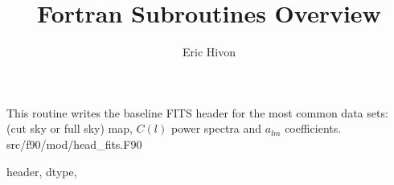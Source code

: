 
\sloppy

\title{\healpix Fortran Subroutines Overview}
 \section[write\_minimal\_header]{ }
\label{sub:write_minimal_header}
\author{Eric Hivon}

\begin{facility}
{This routine writes the baseline FITS header 
for the most common \healpix data sets: (cut sky or full sky) map, $C(l)$ power spectra and $a_{lm}$
coefficients.}
{src/f90/mod/head\_fits.F90}
\end{facility}

\begin{f90format}
{header, dtype,  }
\end{f90format}
\aboutoptional

